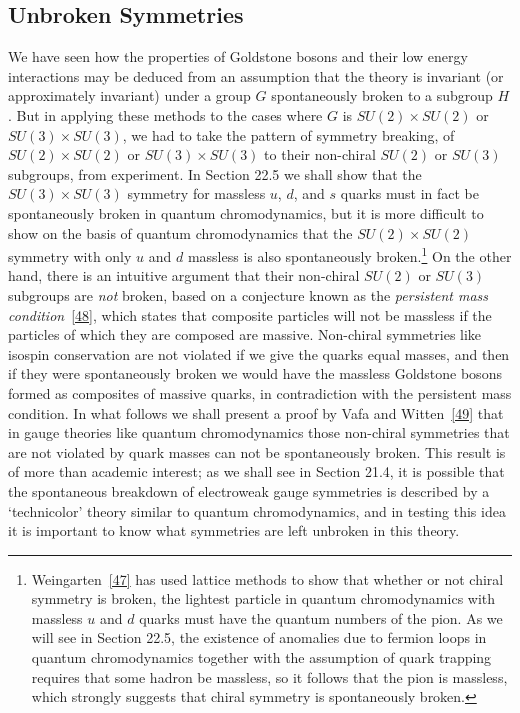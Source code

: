 \subsection{Unbroken Symmetries}
\label{sec:19.9}

We have seen how the properties of Goldstone bosons and their low energy interactions may be deduced from an assumption that the theory is invariant (or approximately invariant) under a group $G$ spontaneously broken to a subgroup $H$. But in applying these methods to the cases where $G$ is $SU(2)\times SU(2)$ or $SU(3)\times SU(3)$, we had to take the pattern of symmetry breaking, of $SU(2)\times SU(2)$ or $SU(3)\times SU(3)$ to their non-chiral $SU(2)$ or $SU(3)$ subgroups, from experiment. In Section 22.5 we shall show that the $SU(3)\times SU(3)$ symmetry for massless $u$, $d$, and $s$ quarks must in fact be spontaneously broken in quantum chromodynamics, but it is more difficult to show on the basis of quantum chromodynamics that the $SU(2)\times SU(2)$ symmetry with only $u$ and $d$ massless is also spontaneously broken.\footnote{Weingarten~\hyperref[ch19-ref-47]{[47]} has used lattice methods to show that whether or not chiral symmetry is broken, the lightest particle in quantum chromodynamics with massless $u$ and $d$ quarks must have the quantum numbers of the pion. As we will see in Section 22.5, the existence of anomalies due to fermion loops in quantum chromodynamics together with the assumption of quark trapping requires that some hadron be massless, so it follows that the pion is massless, which strongly suggests that chiral symmetry is spontaneously broken.} On the other hand, there is an intuitive argument that their non-chiral $SU(2)$ or $SU(3)$ subgroups are \emph{not} broken, based on a conjecture known as the \emph{persistent mass condition}~\hyperref[ch19-ref-48]{[48]}, which states that composite particles will not be massless if the particles of which they are composed are massive. Non-chiral symmetries like isospin conservation are not violated if we give the quarks equal masses, and then if they were spontaneously broken we would have the massless Goldstone bosons formed as composites of massive quarks, in contradiction with the persistent mass condition. In what follows we shall present a proof by Vafa and Witten~\hyperref[ch19-ref-49]{[49]} that in gauge theories like quantum chromodynamics those non-chiral symmetries that are not violated by quark masses can not be spontaneously broken. This result is of more than academic interest; as we shall see in Section 21.4, it is possible that the spontaneous breakdown of electroweak gauge symmetries is described by a `technicolor' theory similar to quantum chromodynamics, and in testing this idea it is important to know what symmetries are left unbroken in this theory.

